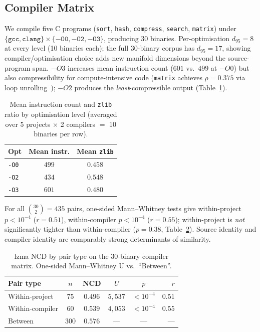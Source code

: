 \documentclass[conference]{IEEEtran}
\newcommand{\zlib}{\texttt{zlib}}
\begin{document}
\subsection{Compiler Matrix}
\label{sec:compiler}

We compile five C programs (\texttt{sort}, \texttt{hash},
\texttt{compress}, \texttt{search}, \texttt{matrix}) under
$\{\mathtt{gcc},\mathtt{clang}\}\times\{-\mathtt{O0,-O2,-O3}\}$,
producing 30 binaries.  Per-optimisation $d_{95}{=}8$ at every
level (10 binaries each); the full 30-binary corpus has $d_{95}{=}17$,
showing compiler/optimisation choice adds new manifold dimensions
beyond the source-program span.  $-O3$ increases mean instruction
count ($601$ vs.\ $499$ at $-O0$) but also compressibility for
compute-intensive code (\texttt{matrix} achieves $\rho{=}0.375$ via
loop unrolling~\cite{agner2024optimizing}); $-O2$ produces the
\emph{least}-compressible output (Table~\ref{tab:opt_level}).

\begin{table}[t]
\centering
\caption{Mean instruction count and \zlib{} ratio by optimisation
         level (averaged over 5 projects $\times$ 2 compilers
         $=$ 10 binaries per row).}
\label{tab:opt_level}
\begin{tabular}{@{}lcc@{}}
\toprule
\textbf{Opt} & \textbf{Mean instr.} & \textbf{Mean \zlib{}} \\
\midrule
\texttt{-O0} & $499$ & $0.458$ \\
\texttt{-O2} & $434$ & $0.548$ \\
\texttt{-O3} & $601$ & $0.480$ \\
\bottomrule
\end{tabular}
\end{table}

For all $\binom{30}{2}{=}435$ pairs, one-sided Mann--Whitney
tests give within-project $p{<}10^{-4}$ ($r{=}0.51$), within-compiler
$p{<}10^{-4}$ ($r{=}0.55$); within-project is \emph{not} significantly
tighter than within-compiler ($p{=}0.38$, Table~\ref{tab:proj_vs_cc}).
Source identity and compiler identity are comparably strong
determinants of similarity.

\begin{table}[t]
\centering
\caption{lzma NCD by pair type on the 30-binary compiler matrix.
         One-sided Mann--Whitney U vs.\ ``Between''.}
\label{tab:proj_vs_cc}
\begin{tabular}{@{}lccccr@{}}
\toprule
\textbf{Pair type} & $n$ & \textbf{NCD} & $U$ & $p$ & $r$ \\
\midrule
Within-project   & 75  & $0.496$ & $5{,}537$ & $<10^{-4}$ & $0.51$ \\
Within-compiler  & 60  & $0.539$ & $4{,}053$ & $<10^{-4}$ & $0.55$ \\
Between          & 300 & $0.576$ & ---       & ---        & ---    \\
\bottomrule
\end{tabular}
\end{table}
\end{document}
